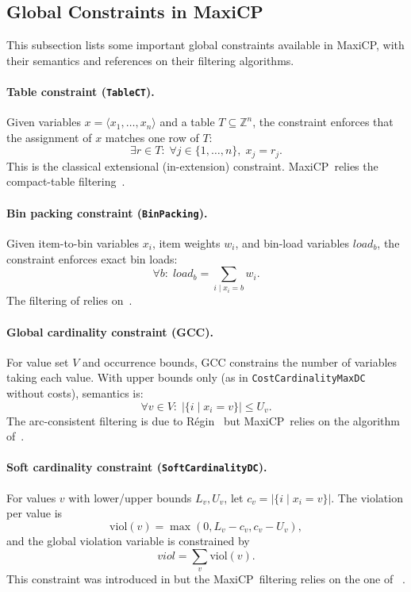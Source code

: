 \documentclass[11pt, a4paper]{scrartcl}
\newcommand{\maxicp}{\textsf{MaxiCP}}
\begin{document}
\subsection{Global Constraints in \maxicp\ }

This subsection lists some important global constraints available in \maxicp,
with their semantics and references on their filtering algorithms.

\paragraph{Table constraint (\texttt{TableCT}).}
Given variables $x = \langle x_1,\ldots,x_n\rangle$ and a table
$T \subseteq \mathbb{Z}^n$, the constraint enforces that the assignment of $x$
matches one row of $T$:
\[
\exists r \in T:\; \forall j \in \{1,\ldots,n\},\; x_j = r_j.
\]
This is the classical extensional (in-extension) constraint.
\maxicp\ relies the compact-table filtering~\cite{demeulenaere2016compact}.

\paragraph{Bin packing constraint (\texttt{BinPacking}).}
Given item-to-bin variables $x_i$, item weights $w_i$, and bin-load variables
$\mathit{load}_b$, the constraint enforces exact bin loads:
\[
\forall b:\; \mathit{load}_b = \sum_{i \mid x_i = b} w_i.
\]
The filtering of relies on~\cite{shaw2004constraint,schaus2009solving,derval2018improved}.

\paragraph{Global cardinality constraint (GCC).}
For value set $V$ and occurrence bounds, GCC constrains the number of
variables taking each value. With upper bounds only (as in
\texttt{CostCardinalityMaxDC} without costs), semantics is:
\[
\forall v \in V:\; \left|\{i \mid x_i = v\}\right| \le U_v.
\]
The arc-consistent filtering is due to R\'egin~\cite{regin1996generalized}
but \maxicp\ relies on the algorithm of~\cite{schmied2025efficient}.

\paragraph{Soft cardinality constraint (\texttt{SoftCardinalityDC}).}
For values $v$ with lower/upper bounds $L_v, U_v$, let
$c_v = \left|\{i \mid x_i = v\}\right|$. The violation per value is
\[
\mathrm{viol}(v) = \max(0, L_v - c_v, c_v - U_v),
\]
and the global violation variable is constrained by
\[
\mathit{viol} = \sum_v \mathrm{viol}(v).
\]
This constraint was introduced in \cite{van2006global} 
but the \maxicp\ filtering relies on the one of ~\cite{schaus2010revisiting,zanarini2006improved}.
\end{document}

